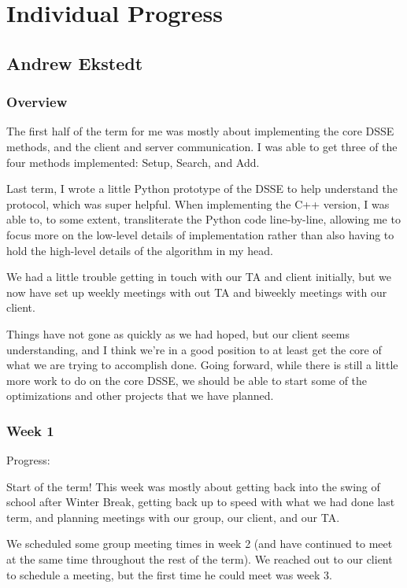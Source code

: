 \documentclass[onecolumn, draftclsnofoot,10pt, compsoc]{IEEEtran}
\begin{document}
\section{Individual Progress}

\subsection{Andrew Ekstedt}

\subsubsection{Overview}

The first half of the term for me was mostly about implementing the core DSSE methods, and the client and server communication.
I was able to get three of the four methods implemented: Setup, Search, and Add.

Last term, I wrote a little Python prototype of the DSSE to help understand the protocol, which was super helpful. When implementing the C++ version, I was able to, to some extent, transliterate the Python code line-by-line, allowing me to focus more on the low-level details of implementation rather than also having to hold the high-level details of the algorithm in my head.

We had a little trouble getting in touch with our TA and client initially, but we now have set up weekly meetings with out TA and biweekly meetings with our client.

Things have not gone as quickly as we had hoped, but our client seems understanding, and I think we're in a good position to at least get the core of what we are trying to accomplish done.
Going forward, while there is still a little more work to do on the core DSSE, we should be able to start some of the optimizations and other projects that we have planned.

\subsubsection{Week 1} 

\noindent Progress: 

Start of the term!
This week was mostly about getting back into the swing of school after Winter Break, getting back up to speed with what we had done last term, and planning meetings with our group, our client, and our TA.

We scheduled some group meeting times in week 2 (and have continued to meet at the same time throughout the rest of the term). We reached out to our client to schedule a meeting, but the first time he could meet was week 3.
\end{document}
